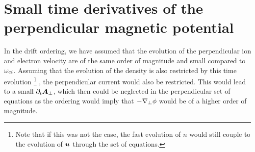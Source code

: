 \section{Small time derivatives of the perpendicular magnetic potential}
%
In the drift ordering, we have assumed that the evolution of the perpendicular ion and electron velocity are of the same order of magnitude and small compared to $\omega_{ci}$.
Assuming that the evolution of the density is also restricted by this time evolution%
%
\footnote{Note that if this was not the case, the fast evolution of $n$ would still couple to the evolution of $\boldsymbol{u}$ through the set of equations.}%
%
, the perpendicular current would also be restricted.
This would lead to a small $\partial_t \boldsymbol{A}_\perp$, which then could be neglected in the perpendicular set of equations as the ordering would imply that $-\nabla_\perp\phi$ would be of a higher order of magnitude.


